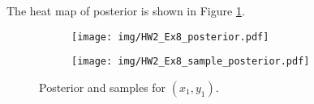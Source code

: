 \begin{exercise}
\begin{enumerate}
            \begin{solution}
                The heat map of posterior is shown in Figure \ref{fig:posterior1}.
                \qedhere
                \begin{figure}[H]
                    \centering
                    \begin{subfigure}{0.5\textwidth}
                        \texttt{[image: img/HW2\_Ex8\_posterior.pdf]}
                        \label{fig:posterior1}
                    \end{subfigure}
                    \hfill
                    \begin{subfigure}{0.45\textwidth}
                        \texttt{[image: img/HW2\_Ex8\_sample\_posterior.pdf]}
                        \label{fig:posterior-sample1}
                    \end{subfigure}
                    \caption{Posterior and samples for $(x_1,y_1)$.}
                \end{figure}
            \end{solution}
            

\end{enumerate}
\end{exercise}
